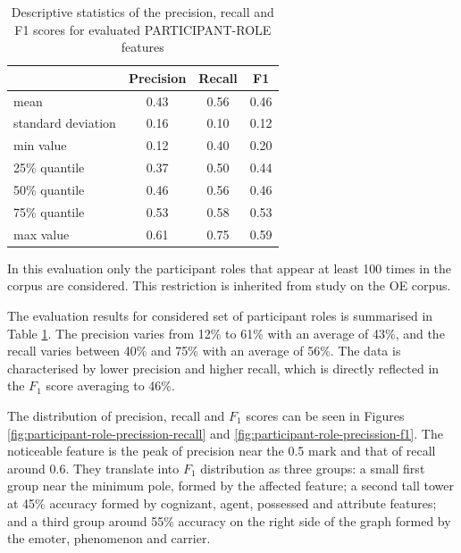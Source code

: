     \begin{table}[!b]
    \centering
    \begin{tabular}{lccc}
        \toprule
        {} & {Precision} & {Recall} & {F1} \\ %
        \midrule
        mean & 0.43 & 0.56 & 0.46 \\
        standard deviation & 0.16 & 0.10 & 0.12 \\
        min value & 0.12 & 0.40 & 0.20 \\
        25\% quantile & 0.37 & 0.50 & 0.44 \\
        50\% quantile & 0.46 & 0.56 & 0.46 \\
        75\% quantile & 0.53 & 0.58 & 0.53 \\
        max value & 0.61 & 0.75 & 0.59 \\
        \bottomrule
    \end{tabular}
    \caption{Descriptive statistics of the precision, recall and F1 scores for evaluated PARTICIPANT-ROLE features}
    \label{tab:features-participant-role-accuracy}
    \end{table}
    
    In this evaluation only the participant roles that appear at least 100 times in the corpus are considered. This restriction is inherited from \citet[160-162]{schulz2015me} study on the OE corpus. %
    
    The evaluation results for considered set of participant roles is summarised in Table \ref{tab:features-participant-role-accuracy}. The precision varies from 12\% to 61\% with an average of 43\%, and the recall varies between 40\% and 75\% with an average of 56\%. The data is characterised by lower precision and higher recall, which is directly reflected in the $F_1$ score averaging to 46\%. 
    
    The distribution of precision, recall and $F_1$ scores can be seen in Figures \ref{fig:participant-role-precission-recall} and \ref{fig:participant-role-precission-f1}. The noticeable feature is the peak of precision near the 0.5 mark and that of recall around 0.6. They translate into $F_1$ distribution as three groups: a small first group near the minimum pole, formed by the affected feature; a second tall tower at 45\% accuracy formed by cognizant, agent, possessed and attribute features; and a third group around 55\% accuracy on the right side of the graph formed by the emoter, phenomenon and carrier.
    
